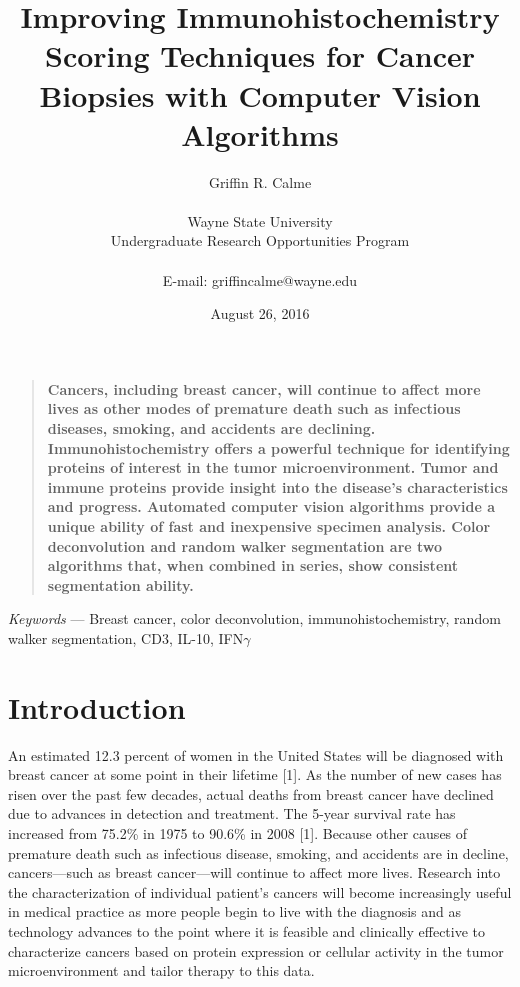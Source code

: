 \documentclass[12pt]{article}
\title{Improving Immunohistochemistry Scoring Techniques for Cancer Biopsies with Computer Vision Algorithms}
\author
{Griffin R. Calme\\
\\
\normalsize{Wayne State University}\\
\normalsize{Undergraduate Research Opportunities Program}\\
\\
\normalsize{E-mail:  griffincalme@wayne.edu}
}
\date{August 26, 2016}
\newenvironment{sciabstract}{%
\begin{quote} \bf}
{\end{quote}}
\begin{document}
 


\baselineskip24pt


\maketitle 




\begin{sciabstract}
  Cancers, including breast cancer, will continue to affect more lives as other modes of premature death such as infectious diseases, smoking, and accidents are declining. Immunohistochemistry offers a powerful technique for identifying proteins of interest in the tumor microenvironment. Tumor and immune proteins provide insight into the disease's characteristics and progress. Automated computer vision algorithms provide a unique ability of fast and inexpensive specimen analysis. Color deconvolution and random walker segmentation are two algorithms that, when combined in series, show consistent segmentation ability.




\end{sciabstract}

\smallskip

\indent \textit{Keywords} --- Breast cancer, color deconvolution, immunohistochemistry, random walker \indent segmentation, CD3, IL-10, IFN$\gamma$



\break
\section*{Introduction}

An estimated 12.3 percent of women in the United States will be diagnosed with breast cancer at some point in their lifetime [1]. As the number of new cases has risen over the past few decades, actual deaths from breast cancer have declined due to advances in detection and treatment. The 5-year survival rate has increased from 75.2\% in 1975 to 90.6\% in 2008 [1]. Because other causes of premature death such as infectious disease, smoking, and accidents are in decline, cancers---such as breast cancer---will continue to affect more lives. Research into the characterization of individual patient's cancers will become increasingly useful in medical practice as more people begin to live with the diagnosis and as technology advances to the point where it is feasible and clinically effective to characterize cancers based on protein expression or cellular activity in the tumor microenvironment and tailor therapy to this data.
\end{document}
